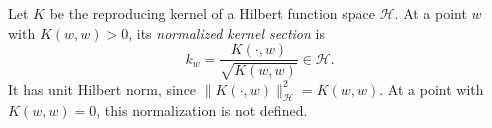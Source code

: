 
Let $K$ be the reproducing kernel of a Hilbert function space $\mathcal H$. At a point $w$ with $K(w,w)>0$, its \emph{normalized kernel section} is
\[
k_w=\frac{K(\cdot,w)}{\sqrt{K(w,w)}}\in\mathcal H.
\]
It has unit Hilbert norm, since $\|K(\cdot,w)\|_{\mathcal H}^2=K(w,w)$. At a point with $K(w,w)=0$, this normalization is not defined.
